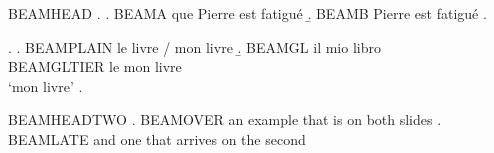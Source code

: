 
\ExAnnotFit

\begin{frame}{BEAMHEAD}
\ex.
\a. BEAMA que Pierre est fatigué\exannot{[CP]}
\b. BEAMB Pierre est fatigué\exannot{[TP]}
\z.

\ex.
\a. BEAMPLAIN le livre / mon livre
\b. \gll BEAMGL il mio libro\\
         BEAMGLTIER le mon livre\\
    \glt `mon livre'
\z.
\end{frame}

\begin{frame}{BEAMHEADTWO}
\ex. BEAMOVER an example that is on both slides\exannot{[XP]}
\pause
\ex. BEAMLATE and one that arrives on the second\exannot{[YP]}
\end{frame}

